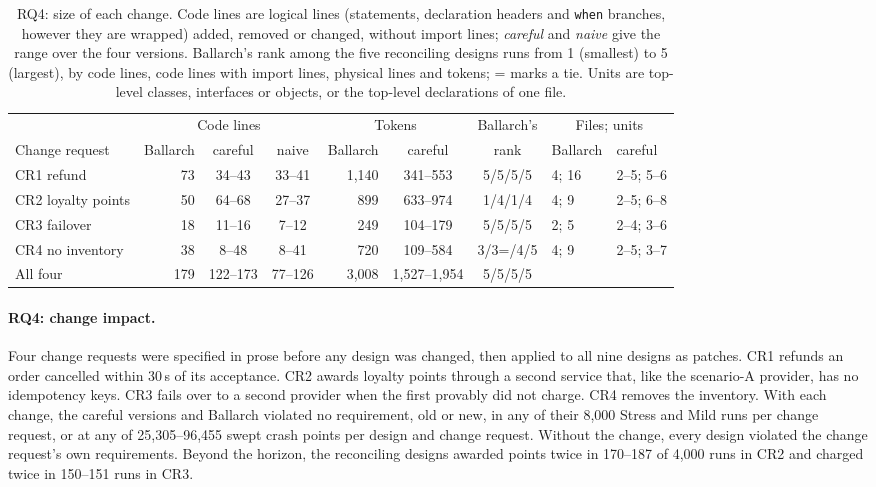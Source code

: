 \documentclass[11pt]{article}
\theoremstyle{definition}
\theoremstyle{plain}
\begin{document}
\begin{table}[t]
\centering\footnotesize
\setlength{\tabcolsep}{4pt}
\begin{tabular}{@{}lrccrccll@{}}
\toprule
& \multicolumn{3}{c}{Code lines} & \multicolumn{2}{c}{Tokens} & Ballarch's & \multicolumn{2}{c}{Files; units} \\
\cmidrule(lr){2-4}\cmidrule(lr){5-6}\cmidrule(l){8-9}
Change request & Ballarch & careful & naive & Ballarch & careful & rank & Ballarch & careful \\
\midrule
CR1 refund & 73 & 34--43 & 33--41 & 1{,}140 & 341--553 & 5/5/5/5 & 4; 16 & 2--5; 5--6 \\
CR2 loyalty points & 50 & 64--68 & 27--37 & 899 & 633--974 & 1/4/1/4 & 4; 9 & 2--5; 6--8 \\
CR3 failover & 18 & 11--16 & 7--12 & 249 & 104--179 & 5/5/5/5 & 2; 5 & 2--4; 3--6 \\
CR4 no inventory & 38 & 8--48 & 8--41 & 720 & 109--584 & 3/3=/4/5 & 4; 9 & 2--5; 3--7 \\
All four & 179 & 122--173 & 77--126 & 3{,}008 & 1{,}527--1{,}954 & 5/5/5/5 & & \\
\bottomrule
\end{tabular}
\caption{RQ4: size of each change. Code lines are logical lines (statements, declaration headers and \texttt{when} branches, however they are wrapped) added, removed or changed, without import lines; \emph{careful} and \emph{naive} give the range over the four versions. Ballarch's rank among the five reconciling designs runs from 1 (smallest) to 5 (largest), by code lines, code lines with import lines, physical lines and tokens; = marks a tie. Units are top-level classes, interfaces or objects, or the top-level declarations of one file.}
\label{tab:rq4}
\end{table}

\paragraph{RQ4: change impact.} Four change requests were specified in prose before any design was changed, then applied to all nine designs as patches. CR1 refunds an order cancelled within 30\,s of its acceptance. CR2 awards loyalty points through a second service that, like the scenario-A provider, has no idempotency keys. CR3 fails over to a second provider when the first provably did not charge. CR4 removes the inventory. With each change, the careful versions and Ballarch violated no requirement, old or new, in any of their 8{,}000 Stress and Mild runs per change request, or at any of 25{,}305--96{,}455 swept crash points per design and change request. Without the change, every design violated the change request's own requirements. Beyond the horizon, the reconciling designs awarded points twice in 170--187 of 4{,}000 runs in CR2 and charged twice in 150--151 runs in CR3.
\end{document}
